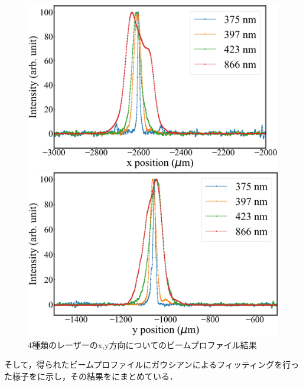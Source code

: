 \begin{figure}[h]
	\begin{center}
	\begin{minipage}{0.48\linewidth}
		\includegraphics[width = 0.98\columnwidth]{./experimental_setup/figure/AllLaserXpos.jpg}
	\end{minipage}
	\begin{minipage}{0.48\linewidth}
		\begin{center}
		\includegraphics[width = 0.98\columnwidth]{./experimental_setup/figure/AllLaserYpos.jpg}
		\end{center}
	\end{minipage}
	\caption{4種類のレーザーのx,y方向についてのビームプロファイル結果}
	\label{fig:AllLaserBeamProfile}
	\end{center}
\end{figure}

そして，得られたビームプロファイルにガウシアンによるフィッティングを行った様子をに示し，その結果をにまとめている．\\

